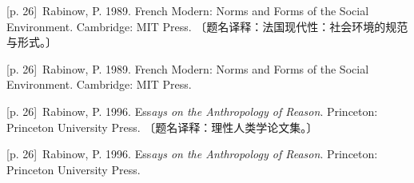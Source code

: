 \documentclass[10pt,a4paper]{article}
\begin{document}
\noindent\begin{minipage}{\textwidth}\begin{minipage}[t]{\dimexpr.5\textwidth-4mm\relax}\noindent\begin{minipage}[t]{\linewidth}{\scriptsize\color{gray} [p. 26]}\ Rabinow, P. 1989. French Modern: Norms and Forms of the Social Environment. Cambridge: MIT Press. 〔题名译释：法国现代性：社会环境的规范与形式。〕\par\end{minipage}\par\end{minipage}\hfill\begin{minipage}[t]{\dimexpr.5\textwidth-4mm\relax}\noindent\begin{minipage}[t]{\linewidth}{\scriptsize\color{gray} [p. 26]}\ Rabinow, P. 1989. French Modern: Norms and Forms of the Social Environment. Cambridge: MIT Press.\par\end{minipage}\par\end{minipage}\end{minipage}\par
\noindent\begin{minipage}{\textwidth}\begin{minipage}[t]{\dimexpr.5\textwidth-4mm\relax}\noindent\begin{minipage}[t]{\linewidth}{\scriptsize\color{gray} [p. 26]}\ Rabinow, P. 1996. Ess\textit{ays on the Anthropology of Reason}. Princeton: Princeton University Press. 〔题名译释：理性人类学论文集。〕\par\end{minipage}\par\end{minipage}\hfill\begin{minipage}[t]{\dimexpr.5\textwidth-4mm\relax}\noindent\begin{minipage}[t]{\linewidth}{\scriptsize\color{gray} [p. 26]}\ Rabinow, P. 1996. Ess\textit{ays on the Anthropology of Reason}. Princeton: Princeton University Press.\par\end{minipage}\par\end{minipage}\end{minipage}\par
\end{document}
